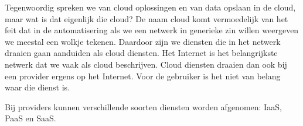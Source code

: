 Tegenwoordig spreken we van cloud oplossingen en van data opslaan in de cloud, maar wat is dat eigenlijk die cloud? De naam cloud komt vermoedelijk van het feit dat in de automatisering als we een netwerk in generieke zin willen weergeven we meestal een wolkje tekenen. Daardoor zijn we diensten die in het netwerk draaien gaan aanduiden als cloud diensten. Het Internet is het belangrijkste netwerk dat we vaak als cloud beschrijven. Cloud diensten draaien dan ook bij een provider ergens op het Internet. Voor de gebruiker is het niet van belang waar die dienst is.

Bij providers kunnen verschillende soorten diensten worden afgenomen: IaaS, PaaS en SaaS.
